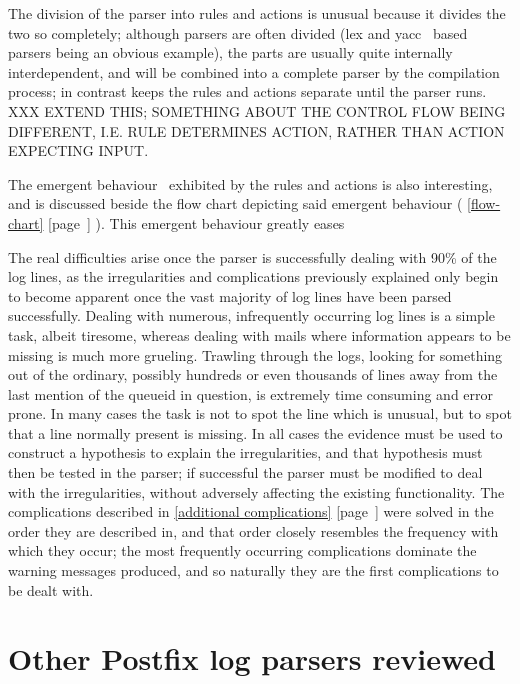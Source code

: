 \documentclass[a4paper,12pt,draft]{article}
\newcommand{\parsername}{\PLP{}}
\newcommand{\refwithpage}[1]{%
    \empty{}\ref{#1} [page~\pageref{#1}]%
}
\newcommand{\sectionref}[1]{%
    \textsection{}\refwithpage{#1}%
}
\begin{document}
The division of the parser into rules and actions is unusual because it
divides the two so completely; although parsers are often divided (lex and
yacc~\cite{lex-and-yacc} based parsers being an obvious example), the parts
are usually quite internally interdependent, and will be combined into a
complete parser by the compilation process; in contrast \parsername{} keeps
the rules and actions separate until the parser runs.  XXX EXTEND THIS\@;
SOMETHING ABOUT THE CONTROL FLOW BEING DIFFERENT, I.E. RULE DETERMINES
ACTION, RATHER THAN ACTION EXPECTING INPUT\@.


The emergent behaviour~\cite{Wikipedia-Emergence} exhibited by the rules
and actions is also interesting, and is discussed beside the flow chart
depicting said emergent behaviour (\sectionref{flow-chart}).  This emergent
behaviour greatly eases 


The real difficulties arise once the parser is successfully dealing with
90\% of the log lines, as the irregularities and complications previously
explained only begin to become apparent once the vast majority of log lines
have been parsed successfully.  Dealing with numerous, infrequently
occurring log lines is a simple task, albeit tiresome, whereas dealing with
mails where information appears to be missing is much more grueling.
Trawling through the logs, looking for something out of the ordinary,
possibly hundreds or even thousands of lines away from the last mention of
the queueid in question, is extremely time consuming and error prone.  In
many cases the task is not to spot the line which is unusual, but to spot
that a line normally present is missing.  In all cases the evidence must be
used to construct a hypothesis to explain the irregularities, and that
hypothesis must then be tested in the parser; if successful the parser must
be modified to deal with the irregularities, without adversely affecting
the existing functionality.  The complications described in
\sectionref{additional complications} were solved in the order they are
described in, and that order closely resembles the frequency with which
they occur; the most frequently occurring complications dominate the
warning messages produced, and so naturally they are the first
complications to be dealt with.

\appendix


\section{Other Postfix log parsers reviewed}
\end{document}

